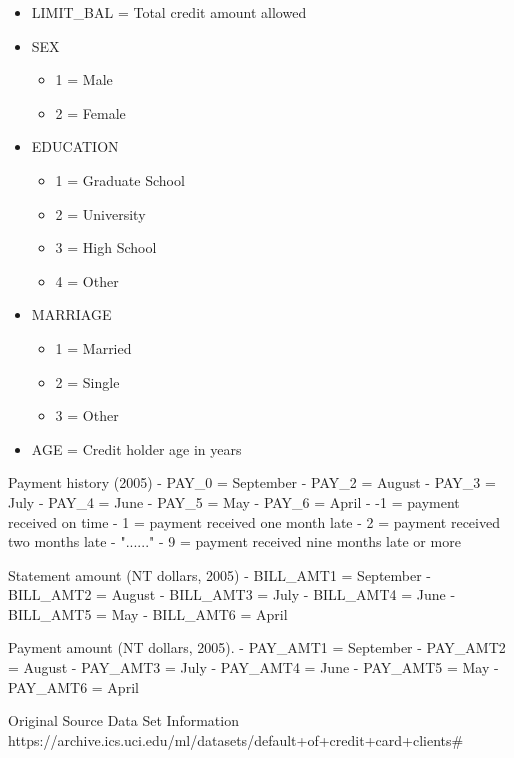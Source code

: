 \documentclass[11pt]{article}
\providecommand{\tightlist}{%
      \setlength{\itemsep}{0pt}\setlength{\parskip}{0pt}}
\begin{document}
\begin{itemize}
\item
  LIMIT\_BAL = Total credit amount allowed
\item
  SEX

  \begin{itemize}
  \tightlist
  \item
    1 = Male
  \item
    2 = Female
  \end{itemize}
\item
  EDUCATION

  \begin{itemize}
  \tightlist
  \item
    1 = Graduate School
  \item
    2 = University
  \item
    3 = High School
  \item
    4 = Other
  \end{itemize}
\item
  MARRIAGE

  \begin{itemize}
  \tightlist
  \item
    1 = Married
  \item
    2 = Single
  \item
    3 = Other
  \end{itemize}
\item
  AGE = Credit holder age in years
\end{itemize}

Payment history (2005) - PAY\_0 = September - PAY\_2 = August - PAY\_3 =
July - PAY\_4 = June - PAY\_5 = May - PAY\_6 = April - -1 = payment
received on time - 1 = payment received one month late - 2 = payment
received two months late - "......" - 9 = payment received nine months
late or more

Statement amount (NT dollars, 2005) - BILL\_AMT1 = September -
BILL\_AMT2 = August - BILL\_AMT3 = July - BILL\_AMT4 = June - BILL\_AMT5
= May - BILL\_AMT6 = April

Payment amount (NT dollars, 2005). - PAY\_AMT1 = September - PAY\_AMT2 =
August - PAY\_AMT3 = July - PAY\_AMT4 = June - PAY\_AMT5 = May -
PAY\_AMT6 = April

Original Source Data Set Information\\
https://archive.ics.uci.edu/ml/datasets/default+of+credit+card+clients\#
\end{document}
